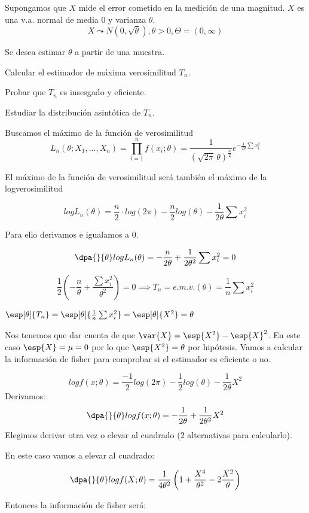 \begin{problem}[2]
Supongamos que $X$ mide el error cometido en la medición de una magnitud. $X$ es una v.a. normal de media 0 y varianza $\theta$. 	
\[X\leadsto N(0,\sqrt{\theta}), \theta>0, \Theta = (0,\infty)\]

Se desea estimar $\theta$ a partir de una muestra.

\ppart Calcular el estimador de máxima verosimilitud $T_n$.

\ppart Probar que $T_n$ es insesgado y eficiente.

\ppart Estudiar la distribución asintótica de $T_n$.

\solution
\spart Buscamos el máximo de la función de verosimilitud
\[
L_n(\theta;X_1,...,X_n) =
\prod_{i=1}^n f(x_i;\theta) =
\frac{1}{(\sqrt{2\pi} \, \theta)^{\frac{n}{2}}} e ^ {-\frac{1}{2\theta} \sum x_i^2}
\]

El máximo de la función de verosimilitud será también el máximo de la logverosimilitud

\[logL_n(\theta) = \frac{n}{2}\cdot log(2\pi) - \frac{n}{2}log(\theta) - \frac{1}{2\theta} \sum x_i^2\]

Para ello derivamos e igualamos a 0.

\[\dpa{}{\theta} logL_n(\theta) = -\frac{n}{2\theta} + \frac{1}{2\theta^2}\sum x_i^2  = 0\]

\[\frac{1}{2}\left( - \frac{n}{\theta} + \frac{\sum x_i^2}{\theta^2}\right) = 0 \implies T_n = e.m.v.(\theta) = \frac{1}{n}\sum x_i^2\]


\spart $\esp[\theta]{T_n} = \esp[\theta]{\frac{1}{n}\sum x_i^2} = \esp[\theta]{X^2} = \theta$

Nos tenemos que dar cuenta de que $\var{X} = \esp{X^2} - \esp{X}^2$. En este caso $\esp{X} = \mu = 0$ por lo que $\esp{X^2} = \theta$ por hipótesis.
Vamos a calcular la información de fisher para comprobar si el estimador es eficiente o no.

\[ log f(x;\theta) = \frac{-1}{2}log(2\pi)-\frac{1}{2}log(\theta) - \frac{1}{2\theta}X^2\]
Derivamos:
\[\dpa{}{\theta} log f(x;\theta) = -\frac{1}{2\theta} + \frac{1}{2\theta^2}X^2\]
Elegimos derivar otra vez o elevar al cuadrado (2 alternativas para calcularlo).

En este caso vamos a elevar al cuadrado:

\[\dpa{}{\theta}logf(X;\theta) = \frac{1}{4\theta^2} \left( 1+\frac{X^4}{\theta^2} - 2\frac{X^2}{\theta}\right)\]

Entonces la información de fisher será:


\end{problem}

